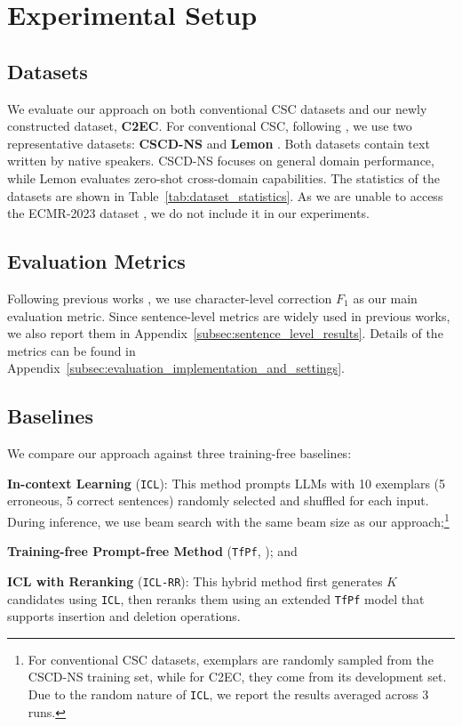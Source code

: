 \section{Experimental Setup}
\subsection{Datasets}
\label{sec:datasets}
We evaluate our approach on both conventional CSC datasets and our newly constructed dataset, \textbf{C2EC}.
For conventional CSC, following \citet{li-etal-2024-cllm}, we use two representative datasets: \textbf{CSCD-NS} \cite{hu-etal-2024-cscd} and \textbf{Lemon} \cite{wu-etal-2023-rethinking}.
Both datasets contain text written by native speakers.
CSCD-NS focuses on general domain performance, while Lemon evaluates zero-shot cross-domain capabilities.
The statistics of the datasets are shown in Table~\ref{tab:dataset_statistics}.
As we are unable to access the ECMR-2023 dataset \cite{he-etal-2023-umrspell}, we do not include it in our experiments.

\subsection{Evaluation Metrics}
Following previous works \cite{li-etal-2024-cllm,zhou-etal-2024-simple}, we use character-level correction $F_1$ as our main evaluation metric.
Since sentence-level metrics are widely used in previous works, we also report them in Appendix~\ref{subsec:sentence_level_results}.
Details of the metrics can be found in Appendix~\ref{subsec:evaluation_implementation_and_settings}.


\subsection{Baselines}
We compare our approach against three training-free baselines:
\begin{inparaenum}[\itshape a)]
    \item \textbf{In-context Learning} (\texttt{ICL}): This method prompts LLMs with 10 exemplars (5 erroneous, 5 correct sentences) randomly selected and shuffled for each input. During inference, we use beam search with the same beam size as our approach;\footnote{For conventional CSC datasets, exemplars are randomly sampled from the CSCD-NS training set, while for C2EC, they come from its development set. Due to the random nature of \texttt{ICL}, we report the results averaged across 3 runs.}
    \item \textbf{Training-free Prompt-free Method} (\texttt{TfPf}, \citet{zhou-etal-2024-simple}); and
    \item \textbf{ICL with Reranking} (\texttt{ICL-RR}): This hybrid method first generates $K$ candidates using \texttt{ICL}, then reranks them using an extended \texttt{TfPf} model that supports insertion and deletion operations.
\end{inparaenum}

